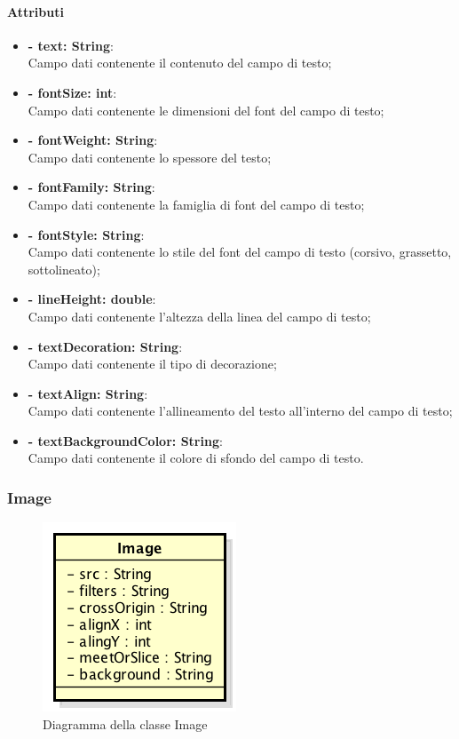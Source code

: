 	\paragraph{Attributi}
	\begin{itemize}
		\item \textbf{- text: String}:\\
			Campo dati contenente il contenuto del campo di testo;
		\item \textbf{- fontSize: int}:\\
			Campo dati contenente le dimensioni del \gls{font} del campo di testo;
		\item \textbf{- fontWeight: String}:\\
			Campo dati contenente lo spessore del testo;
		\item \textbf{- fontFamily: String}:\\
			Campo dati contenente la famiglia di \gls{font} del campo di testo;
		\item \textbf{- fontStyle: String}:\\
			Campo dati contenente lo stile del \gls{font} del campo di testo (corsivo, grassetto, sottolineato);
		\item \textbf{- lineHeight: double}:\\
			Campo dati contenente l'altezza della linea del campo di testo;
		\item \textbf{- textDecoration: String}:\\
			Campo dati contenente il tipo di decorazione;
		\item \textbf{- textAlign: String}:\\
			Campo dati contenente l'allineamento del testo all'interno del campo di testo;
		\item \textbf{- textBackgroundColor: String}:\\
			Campo dati contenente il colore di sfondo del campo di testo.
	\end{itemize}

\newpage


\subsubsection{Image}

	\begin{figure}[h]
		\centering
		\includegraphics[width=0.4\linewidth]{img/premi_front_end_model_image}
		\caption[Diagramma della classe Image]{Diagramma della classe Image}
		\label{fig:back_end_premi_model_image}
	\end{figure}
	
